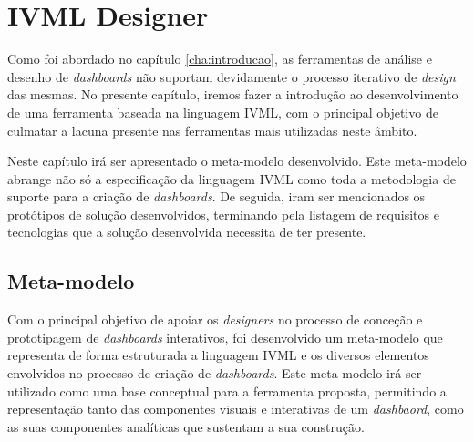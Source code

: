 
%

\chapter{IVML Designer}
\label{cha:ivml_designer}

Como foi abordado no capítulo \ref{cha:introducao}, as ferramentas de análise e desenho de \textit{dashboards} não suportam devidamente o processo iterativo de \textit{design} das mesmas. No presente capítulo, iremos fazer a introdução ao desenvolvimento de uma ferramenta baseada na linguagem \gls{IVML}, com o principal objetivo de culmatar a lacuna presente nas ferramentas mais utilizadas neste âmbito.

Neste capítulo irá ser apresentado o meta-modelo desenvolvido. Este meta-modelo abrange não só a especificação da linguagem \gls{IVML} como toda a metodologia de suporte para a criação de \textit{dashboards}. De seguida, iram ser mencionados os protótipos de solução desenvolvidos, terminando pela listagem de requisitos e tecnologias que a solução desenvolvida necessita de ter presente.

\section{Meta-modelo} %
\label{sec:meta_modelo}

Com o principal objetivo de apoiar os \textit{designers} no processo de conceção e prototipagem de \textit{dashboards} interativos, foi desenvolvido um meta-modelo que representa de forma estruturada a linguagem IVML e os diversos elementos envolvidos no processo de criação de \textit{dashboards}. Este meta-modelo irá ser utilizado como uma base conceptual para a ferramenta proposta, permitindo a representação tanto das componentes visuais e interativas de um \textit{dashbaord}, como as suas componentes analíticas que sustentam a sua construção.

